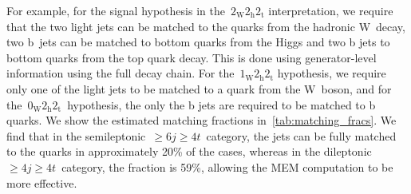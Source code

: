 For example, for the signal hypothesis in the~$2_{\mathrm{W}} 2_{\mathrm{h}} 2_{\mathrm{t}}$ interpretation, we require that the two light jets can be matched to the quarks from the hadronic W~decay, two b~jets can be matched to bottom quarks from the Higgs and two b jets to bottom quarks from the top quark decay. This is done using generator-level information using the full decay chain. For the~$1_{\mathrm{W}} 2_{\mathrm{h}} 2_{\mathrm{t}}$ hypothesis, we require only one of the light jets to be matched to a quark from the W~boson, and for the~$0_{\mathrm{W}} 2_{\mathrm{h}} 2_{\mathrm{t}}$~hypothesis, the only the b jets are  required to be matched to b quarks. We show the estimated matching fractions in~\cref{tab:matching_fracs}. We find that in the semileptonic~$\geq6j\geq4t$~category, the jets can be fully matched to the quarks in approximately 20\% of the cases, whereas in the dileptonic~$\geq4j\geq4t$~category, the fraction is 59\%, allowing the MEM computation to be more effective.

